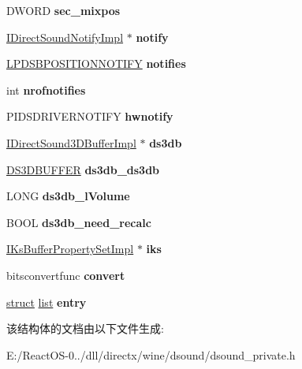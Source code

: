 \begin{DoxyCompactItemize}
D\+W\+O\+RD {\bfseries sec\+\_\+mixpos}
\item 
\mbox{\label{struct_i_direct_sound_buffer_impl_a02138e891a16ea735872f80a2b80f169}} 
\hyperlink{struct_i_direct_sound_notify_impl}{I\+Direct\+Sound\+Notify\+Impl} $\ast$ {\bfseries notify}
\item 
\mbox{\label{struct_i_direct_sound_buffer_impl_a86753bba0b72aa317758ba86fcb8a5dc}} 
\hyperlink{struct___d_s_b_p_o_s_i_t_i_o_n_n_o_t_i_f_y}{L\+P\+D\+S\+B\+P\+O\+S\+I\+T\+I\+O\+N\+N\+O\+T\+I\+FY} {\bfseries notifies}
\item 
\mbox{\label{struct_i_direct_sound_buffer_impl_adddc8a94fad997023be68c722c8f2389}} 
int {\bfseries nrofnotifies}
\item 
\mbox{\label{struct_i_direct_sound_buffer_impl_ad0aad16f3860e766b8a11b3f4194b8ff}} 
P\+I\+D\+S\+D\+R\+I\+V\+E\+R\+N\+O\+T\+I\+FY {\bfseries hwnotify}
\item 
\mbox{\label{struct_i_direct_sound_buffer_impl_a13b1d4e803dc8174e97ae2f16ffb4b02}} 
\hyperlink{struct_i_direct_sound3_d_buffer_impl}{I\+Direct\+Sound3\+D\+Buffer\+Impl} $\ast$ {\bfseries ds3db}
\item 
\mbox{\label{struct_i_direct_sound_buffer_impl_a98cfe8fc8f4256c9f7b7ab1e6d023c09}} 
\hyperlink{struct___d_s3_d_b_u_f_f_e_r}{D\+S3\+D\+B\+U\+F\+F\+ER} {\bfseries ds3db\+\_\+ds3db}
\item 
\mbox{\label{struct_i_direct_sound_buffer_impl_a912a4938f9466614d1b9225db0f5d104}} 
L\+O\+NG {\bfseries ds3db\+\_\+l\+Volume}
\item 
\mbox{\label{struct_i_direct_sound_buffer_impl_a108a9a841f628f08cfe845ed1aa7749e}} 
B\+O\+OL {\bfseries ds3db\+\_\+need\+\_\+recalc}
\item 
\mbox{\label{struct_i_direct_sound_buffer_impl_a49efde6c20e97e353c4d2e2e5a2d230e}} 
\hyperlink{struct_i_ks_buffer_property_set_impl}{I\+Ks\+Buffer\+Property\+Set\+Impl} $\ast$ {\bfseries iks}
\item 
\mbox{\label{struct_i_direct_sound_buffer_impl_a2b3df3d8e5cee8ef99e05d5535f6f638}} 
bitsconvertfunc {\bfseries convert}
\item 
\mbox{\label{struct_i_direct_sound_buffer_impl_a25259ceda3d0e78642fd461820b1d825}} 
\hyperlink{interfacestruct}{struct} \hyperlink{classlist}{list} {\bfseries entry}
\end{DoxyCompactItemize}


该结构体的文档由以下文件生成\+:\begin{DoxyCompactItemize}
\item 
E\+:/\+React\+O\+S-\/0../dll/directx/wine/dsound/dsound\+\_\+private.\+h\end{DoxyCompactItemize}
